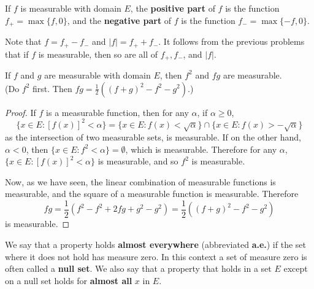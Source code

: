 \begin{defn}\label{d:pos_neg_fun}%
	If $f$ is measurable with domain $E$, the \textbf{positive part} of $f$ is 
	the function $f_+ = \max\{f,0\}$, and the \textbf{negative part} of $f$ is 
	the function $f_- = \max\{-f,0\}$. 
\end{defn}

\begin{rmk}%
	Note that $f = f_+ - f_-$ and $|f| = f_+ + f_-$. It follows from the 
	previous problems that if $f$ is measurable, then so are all of $f_+, f_-$, 
	and $|f|$. 
\end{rmk}

\begin{pblm}%
	If $f$ and $g$ are measurable with domain $E$, then $f^2$ and $fg$ are 
	measurable. \\ (Do $f^2$ first. Then 
	$fg = \frac{1}{2}\left( (f + g)^2 - f^2 - g^2\right)$.)
\begin{proof}
	If $f$ is a measurable function, then for any $\alpha$, if $\alpha \ge 0$, 
	\begin{equation*}
		\{x \in E: [f(x)]^2 < \alpha\} = \{x \in E: f(x) < \sqrt{\alpha}\} \cap \{x \in E: f(x) > -\sqrt{\alpha}\}
	\end{equation*}
	as the intersection of two measurable sets, is measurable. 
	If on the other hand, $\alpha < 0$, then $\{x \in E: f^2 < \alpha\} = \emptyset$, which is measurable. 
	Therefore for any $\alpha$, $\{x \in E: [f(x)]^2 < \alpha\}$ is measurable, and so $f^2$ is measurable. 

	Now, as we have seen, the linear combination of measurable functions is measurable, and the 
	square of a measurable function is measurable. Therefore 
	\begin{equation*}
		fg = \frac{1}{2}\left(f^2 - f^2 + 2fg + g^2 - g^2\right) = 
		\frac{1}{2}\left((f+g)^2 - f^2 - g^2\right)
	\end{equation*}
	is measurable. 
\end{proof}
\end{pblm}

\begin{defn}\label{d:ae}%
	We say that a property holds \textbf{almost everywhere} (abbreviated 
	\textbf{a.e.}) if the set where it does not hold has measure zero. In this 
	context a set of measure zero is often called a \textbf{null set}. We also 
	say that a property that holds in a set $E$ except on a null set holds for 
	\textbf{almost all} $x$ in $E$. 
\end{defn}

